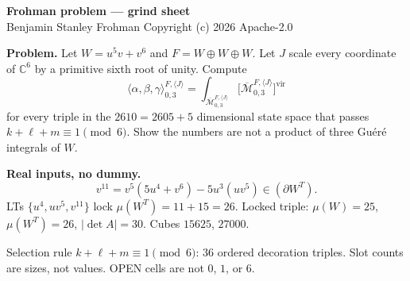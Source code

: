 \documentclass[11pt]{article}
\begin{document}
\begin{center}
{\Large\textbf{Frohman problem --- grind sheet}}\\[0.4em]
Benjamin Stanley Frohman \quad Copyright (c) 2026 \quad Apache-2.0
\end{center}
\vspace{0.8em}
\noindent\textbf{Problem.} Let $W=u^5v+v^6$ and $F=W\oplus W\oplus W$. Let $J$ scale every coordinate of $\mathbb{C}^6$ by a primitive sixth root of unity. Compute
\[
\langle\alpha,\beta,\gamma\rangle_{0,3}^{F,\langle J\rangle}
=\int_{\overline{\mathcal{M}}_{0,3}^{F,\langle J\rangle}}
\bigl[\overline{\mathcal{M}}_{0,3}^{F,\langle J\rangle}\bigr]^{\mathrm{vir}}
\]
for every triple in the $2610=2605+5$ dimensional state space that passes $k+\ell+m\equiv 1\pmod{6}$. Show the numbers are not a product of three Gu\'er\'e integrals of $W$.

\vspace{0.5em}
\noindent\textbf{Real inputs, no dummy.}
\[
v^{11}=v^5(5u^4+v^6)-5u^3(uv^5)\in(\partial W^T).
\]
LTs $\{u^4,uv^5,v^{11}\}$ lock $\mu(W^T)=11+15=26$. Locked triple: $\mu(W)=25$, $\mu(W^T)=26$, $|\det A|=30$. Cubes $15625$, $27000$.

\vspace{0.4em}
\noindent Selection rule $k+\ell+m\equiv 1\pmod{6}$: $36$ ordered decoration triples. Slot counts are sizes, not values. OPEN cells are not $0$, $1$, or $6$.
\end{document}
